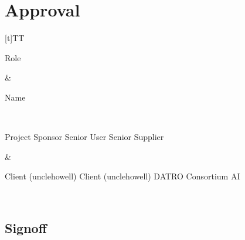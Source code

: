 \documentclass[letterpaper,10pt,openany,oneside,english]{sphinxmanual}
\begin{document}
\sphinxstepscope


\section{Approval}
\label{\detokenize{approval:approval}}\label{\detokenize{approval::doc}}

\begin{savenotes}\sphinxattablestart
\sphinxthistablewithglobalstyle
\centering
\begin{tabulary}{\linewidth}[t]{TT}
\sphinxtoprule
\begin{varwidth}[t]{}
\sphinxstyletheadfamily \sphinxAtStartPar
Role
\sphinxbeforeendvarwidth
\end{varwidth}%
&\begin{varwidth}[t]{}
\sphinxstyletheadfamily \sphinxAtStartPar
Name
\sphinxbeforeendvarwidth
\end{varwidth}%
\\
\sphinxmidrule
\sphinxtableatstartofbodyhook\begin{varwidth}[t]{}
\sphinxAtStartPar
Project Sponsor
Senior User
Senior Supplier
\sphinxbeforeendvarwidth
\end{varwidth}%
&\begin{varwidth}[t]{}
\sphinxAtStartPar
Client (unclehowell)
Client (unclehowell)
DATRO Consortium \sphinxhyphen{} AI
\sphinxbeforeendvarwidth
\end{varwidth}%
\\
\sphinxbottomrule
\end{tabulary}
\sphinxtableafterendhook\par
\sphinxattableend\end{savenotes}


\subsection{Sign\sphinxhyphen{}off}
\label{\detokenize{approval:sign-off}}
\end{document}
